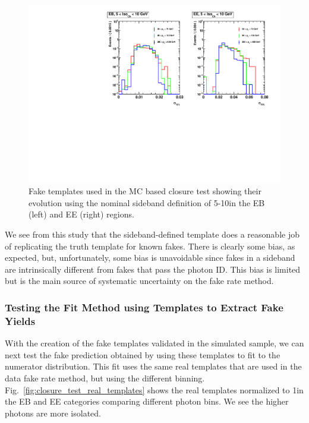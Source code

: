 \begin{figure}[!htbp]
  \centering
  \includegraphics[scale=0.63]{figures/closure_test_fake_templates_sieie_overlaid_sample_all.pdf}
  \caption{Fake templates used in the MC based closure test showing their \pt evolution using the nominal \chiso sideband definition of 5-10\GeV in the EB (left) and EE (right) regions.}
  \label{fig:mc_fake_templates_fixed_sideband}
\end{figure}

We see from this study that the sideband-defined template does a reasonable job of replicating the truth template for known fakes. There is clearly some bias, as expected, but, unfortunately, some bias is unavoidable since fakes in a sideband are intrinsically different from fakes that pass the photon ID. This bias is limited but is the main source of systematic uncertainty on the fake rate method.


\subsubsection{Testing the Fit Method using Templates to Extract Fake Yields}

With the creation of the fake templates validated in the simulated sample, we can next test the fake prediction obtained by using these templates to fit to the numerator \sieie distribution. This fit uses the same real templates that are used in the data fake rate method, but using the different \pt binning. Fig.~\ref{fig:closure_test_real_templates} shows the real templates normalized to 1\fbinv in the EB and EE categories comparing different photon \pt bins. We see the higher \pt photons are more isolated.

